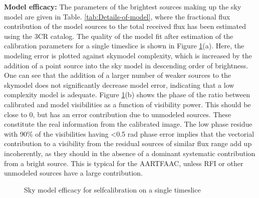 \documentclass{aa}
\begin{document}
\textbf{Model efficacy: }The  parameters of the brightest sources  making up the
sky model are given  in Table.  \ref{tab:Details-of-model}, where the fractional
flux  contribution of  the model  sources to  the total  received flux  has been
estimated using the  3CR catalog. The quality of the  model fit after estimation
of  the  calibration  parameters for  a  single  timeslice  is shown  in  Figure
\ref{fig:The-model-amplitude}(a).  Here,  the modeling error  is plotted against
skymodel complexity, which  is increased by the addition of  a point source into
the sky model  in descending order of brightness. One can  see that the addition
of a  larger number  of weaker  sources to the  skymodel does  not significantly
decrease  model error,  indicating  that  a low  complexity  model is  adequate.
Figure  \ref{fig:The-model-amplitude}(b) shows  the phase  of the  ratio between
calibrated  and model  visibilities as  a  function of  visibility power.   This
should be  close to 0, but has  an error contribution due  to unmodeled sources.
These constitute the real information  from the calibrated image.  The low phase
residue with 90\%  of the visibilities having <0.5 rad  phase error implies that
the vectorial contribution to a  visibility from the residual sources of similar
flux range  add up  incoherently, as they  should in  the absence of  a dominant
systematic contribution from a bright  source. This is typical for the AARTFAAC,
unless RFI or other unmodeled sources have a large contribution.

\begin{figure}[tbh]
  \caption{Sky model efficacy for selfcalibration on a single timeslice}
  \label{fig:The-model-amplitude}
\end{figure}
\end{document}
